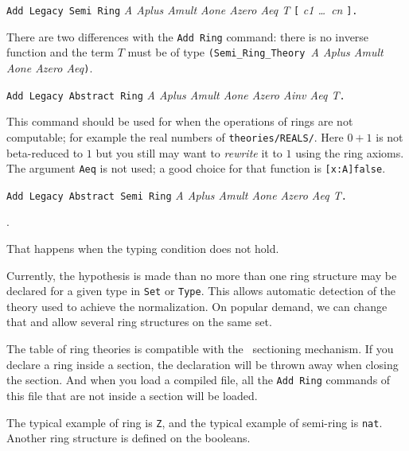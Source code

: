 \begin{Variants}
\item \texttt{Add Legacy Semi Ring} \textit{A Aplus Amult Aone Azero Aeq T} 
  \texttt{[} \textit{c1 \dots\ cn} \texttt{].}
  
  There are two differences with the \texttt{Add Ring} command: there
  is no inverse function and the term $T$ must be of type
  \texttt{(Semi\_Ring\_Theory }\textit{A Aplus Amult Aone Azero
    Aeq}\texttt{)}.

\item \texttt{Add Legacy Abstract Ring} \textit{A Aplus Amult Aone Azero Ainv 
    Aeq T}\texttt{.}
  
  This command should be used for when the operations of rings are not
  computable; for example the real numbers of
  \texttt{theories/REALS/}. Here $0+1$ is not beta-reduced to $1$ but
  you still may want to \textit{rewrite} it to $1$ using the ring
  axioms. The argument \texttt{Aeq} is not used; a good choice for
  that function is \verb+[x:A]false+.

\item \texttt{Add Legacy Abstract Semi Ring} \textit{A Aplus Amult Aone Azero
    Aeq T}\texttt{.}

\end{Variants}

\begin{ErrMsgs}
\item {}.
 
  That happens when the typing condition does not hold.
\end{ErrMsgs}

Currently, the hypothesis is made than no more than one ring structure
may be declared for a given type in \texttt{Set} or \texttt{Type}.
This allows automatic detection of the theory used to achieve the
normalization. On popular demand, we can change that and allow several
ring structures on the same set.

The table of ring theories is compatible with the \Coq\ 
sectioning mechanism. If you declare a ring inside a section, the
declaration will be thrown away when closing the section.
And when you load a compiled file, all the \texttt{Add Ring}
commands of this file that are not inside a section will be loaded.

The typical example of ring is \texttt{Z}, and the typical example of
semi-ring is \texttt{nat}. Another ring structure is defined on the
booleans. 

